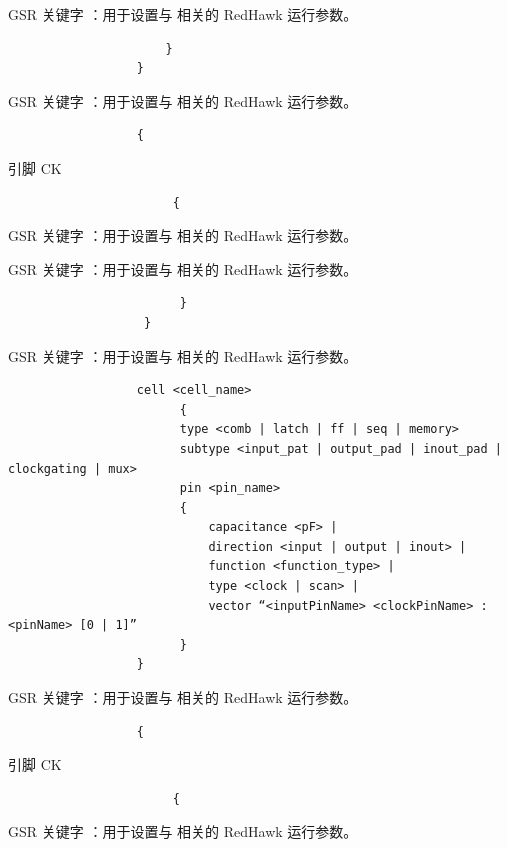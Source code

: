 GSR 关键字 ：用于设置与  相关的 RedHawk 运行参数。

\begin{lstlisting}
                      }
                  }
\end{lstlisting}

GSR 关键字 ：用于设置与  相关的 RedHawk 运行参数。

\begin{lstlisting}
                  {
\end{lstlisting}

引脚 CK

\begin{lstlisting}
                       {
\end{lstlisting}

GSR 关键字 ：用于设置与  相关的 RedHawk 运行参数。

GSR 关键字 ：用于设置与  相关的 RedHawk 运行参数。

\begin{lstlisting}
                        }
                   }
\end{lstlisting}

GSR 关键字 ：用于设置与  相关的 RedHawk 运行参数。

\begin{lstlisting}
                  cell <cell_name>
                        {
                        type <comb | latch | ff | seq | memory>
                        subtype <input_pat | output_pad | inout_pad | clockgating | mux>
                        pin <pin_name>
                        {
                            capacitance <pF> |
                            direction <input | output | inout> |
                            function <function_type> |
                            type <clock | scan> |
                            vector “<inputPinName> <clockPinName> : <pinName> [0 | 1]”
                        }
                  }
\end{lstlisting}

GSR 关键字 ：用于设置与  相关的 RedHawk 运行参数。

\begin{lstlisting}
                  {
\end{lstlisting}

引脚 CK

\begin{lstlisting}
                       {
\end{lstlisting}

GSR 关键字 ：用于设置与  相关的 RedHawk 运行参数。

